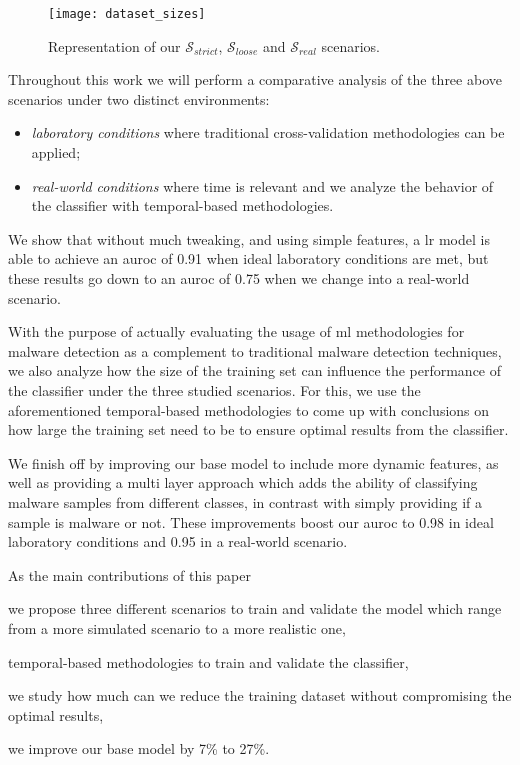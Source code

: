 \begin{figure}[!h]
	\centering
	\texttt{[image: dataset\_sizes]}
	\caption{Representation of our $\mathcal{S}_{strict}$, $\mathcal{S}_{loose}$ and $\mathcal{S}_{real}$ scenarios.}
	\label{fig:scenarios}
\end{figure}

Throughout this work we will perform a comparative analysis of the three above scenarios under two distinct environments:

\begin{itemize}[noitemsep]
	\item \emph{laboratory conditions} where traditional cross-validation methodologies can be applied;
	\item \emph{real-world conditions} where time is relevant and we analyze the behavior of the classifier with temporal-based methodologies.
\end{itemize}

We show that without much tweaking, and using simple features, a \gls{lr} model is able to achieve an \gls{auroc} of 0.91 when ideal laboratory conditions are met, but these results go down to an \gls{auroc} of 0.75 when we change into a real-world scenario.

With the purpose of actually evaluating the usage of \gls{ml} methodologies for malware detection as a complement to traditional malware detection techniques, we also analyze how the size of the training set can influence the performance of the classifier under the three studied scenarios.
For this, we use the aforementioned temporal-based methodologies to come up with conclusions on how large the training set need to be to ensure optimal results from the classifier.

We finish off by improving our base model to include more dynamic features, as well as providing a multi layer approach which adds the ability of classifying malware samples from different classes, in contrast with simply providing if a sample is malware or not.
These improvements boost our \gls{auroc} to 0.98 in ideal laboratory conditions and 0.95 in a real-world scenario.

As the main contributions of this paper
\begin{enumerate*}[label={\alph*)},font={\color{red!80!black}\bfseries}]
	\item we propose three different scenarios to train and validate the model which range from a more simulated scenario to a more realistic one,
	\item temporal-based methodologies to train and validate the classifier, 
	\item we study how much can we reduce the training dataset without compromising the optimal results,
	\item we improve our base model by 7\% to 27\%.

\end{enumerate*}



